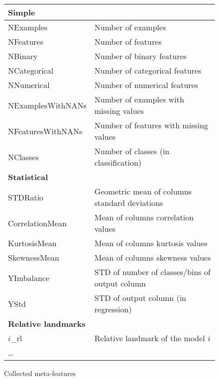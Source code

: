 \documentclass[hidelinks, english]{mvi-report}
\begin{document}
\begin{figure*}[t]
\center
    \begin{tabular}[c]{l l}
    \textbf{Simple}   & \\
    \hline
    NExamples         & Number of examples                      \\
    NFeatures         & Number of features                      \\
    NBinary           & Number of binary features               \\
    NCategorical      & Number of categorical features          \\
    NNumerical        & Number of numerical features            \\
    NExamplesWithNANs & Number of examples with missing values  \\
    NFeaturesWithNANs & Number of features with missing values  \\
    NClasses          & Number of classes (in classification)   \\
    \hline
    \textbf{Statistical}   & \\
    \hline
    STDRatio          & Geometric mean of columns standard deviations   \\
    CorrelationMean   & Mean of columns correlation values              \\
    KurtosisMean      & Mean of columns kurtosis values                 \\
    SkewnessMean      & Mean of columns skewness values                 \\
    YImbalance        & STD of number of classes/bins of output column  \\
    YStd              & STD of output column (in regression)            \\
    \hline
    \textbf{Relative landmarks}   & \\
    \hline
    $i$\_rl              & Relative landmark of the model $i$ \\
    \dots                & \\
    \end{tabular}

\caption{Collected meta-features}
\label{fig:meta-features}
\end{figure*}
\end{document}
